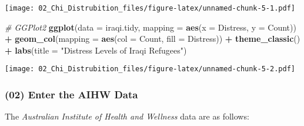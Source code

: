 \documentclass[
]{article}
\newenvironment{Shaded}{\begin{snugshade}}{\end{snugshade}}
\newcommand{\CommentTok}[1]{\textcolor[rgb]{0.56,0.35,0.01}{\textit{#1}}}
\newcommand{\DataTypeTok}[1]{\textcolor[rgb]{0.13,0.29,0.53}{#1}}
\newcommand{\FloatTok}[1]{\textcolor[rgb]{0.00,0.00,0.81}{#1}}
\newcommand{\KeywordTok}[1]{\textcolor[rgb]{0.13,0.29,0.53}{\textbf{#1}}}
\newcommand{\NormalTok}[1]{#1}
\newcommand{\OperatorTok}[1]{\textcolor[rgb]{0.81,0.36,0.00}{\textbf{#1}}}
\newcommand{\OtherTok}[1]{\textcolor[rgb]{0.56,0.35,0.01}{#1}}
\newcommand{\StringTok}[1]{\textcolor[rgb]{0.31,0.60,0.02}{#1}}
\begin{document}
\texttt{[image: 02\_Chi\_Distrubition\_files/figure-latex/unnamed-chunk-5-1.pdf]}

\begin{Shaded}
\begin{Highlighting}[]
\CommentTok{\# GGPlot2}
\KeywordTok{ggplot}\NormalTok{(}\DataTypeTok{data =}\NormalTok{ iraqi.tidy, }\DataTypeTok{mapping =} \KeywordTok{aes}\NormalTok{(}\DataTypeTok{x =}\NormalTok{ Distress, }\DataTypeTok{y =}\NormalTok{ Count)) }\OperatorTok{+}\StringTok{ }
\StringTok{  }\KeywordTok{geom\_col}\NormalTok{(}\DataTypeTok{mapping =} \KeywordTok{aes}\NormalTok{(}\DataTypeTok{col =}\NormalTok{ Count, }\DataTypeTok{fill =}\NormalTok{ Distress)) }\OperatorTok{+}\StringTok{ }
\StringTok{  }\KeywordTok{theme\_classic}\NormalTok{() }\OperatorTok{+}
\StringTok{  }\KeywordTok{labs}\NormalTok{(}\DataTypeTok{title =} \StringTok{"Distress Levels of Iraqi Refugees"}\NormalTok{)}
\end{Highlighting}
\end{Shaded}

\texttt{[image: 02\_Chi\_Distrubition\_files/figure-latex/unnamed-chunk-5-2.pdf]}

\hypertarget{enter-the-aihw-data}{%
\subsubsection{(02) Enter the AIHW Data}\label{enter-the-aihw-data}}

The \emph{Australian Institute of Health and Wellness} data are as
follows:

\begin{Shaded}
\end{Shaded}
\end{document}
